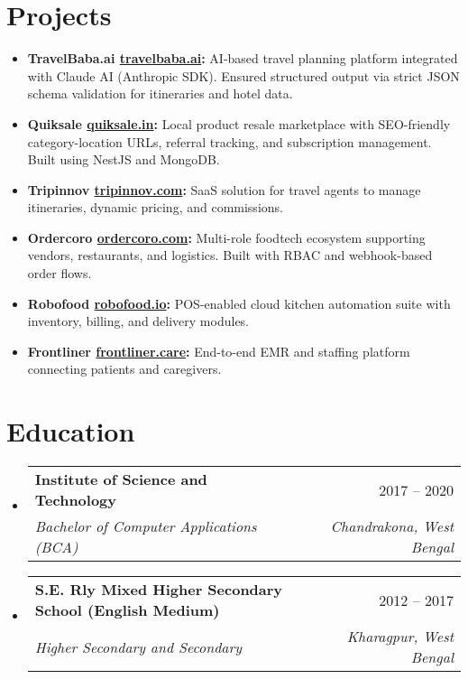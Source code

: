 \documentclass[letterpaper,11pt]{article}
\makeatletter
\newcommand{\resumeItem}[2]{
  \item\small{
    \textbf{#1:} #2 \vspace{-2pt}
  }
}
\newcommand{\resumeSubheading}[4]{
  \vspace{-1pt}\item
    \begin{tabular*}{0.97\textwidth}{l@{\extracolsep{\fill}}r}
      \textbf{#1} & #2 \\
      \textit{\small#3} & \textit{\small #4} \\
    \end{tabular*}\vspace{-5pt}
}
\newcommand{\resumeSubItem}[2]{\resumeItem{#1}{#2}\vspace{-4pt}}
\newcommand{\resumeSubHeadingListStart}{\begin{itemize}[leftmargin=*]}
\newcommand{\resumeSubHeadingListEnd}{\end{itemize}}
\makeatother
\begin{document}
\section{Projects}
\resumeSubHeadingListStart
  \resumeSubItem{TravelBaba.ai \href{https://travelbaba.ai}{travelbaba.ai}}
    {AI-based travel planning platform integrated with Claude AI (Anthropic SDK). Ensured structured output via strict JSON schema validation for itineraries and hotel data.}
  \resumeSubItem{Quiksale \href{https://quiksale.in}{quiksale.in}}
    {Local product resale marketplace with SEO-friendly category-location URLs, referral tracking, and subscription management. Built using NestJS and MongoDB.}
  \resumeSubItem{Tripinnov \href{https://tripinnov.com}{tripinnov.com}}
    {SaaS solution for travel agents to manage itineraries, dynamic pricing, and commissions.}
  \resumeSubItem{Ordercoro \href{https://ordercoro.com}{ordercoro.com}}
    {Multi-role foodtech ecosystem supporting vendors, restaurants, and logistics. Built with RBAC and webhook-based order flows.}
  \resumeSubItem{Robofood \href{https://robofood.io}{robofood.io}}
    {POS-enabled cloud kitchen automation suite with inventory, billing, and delivery modules.}
  \resumeSubItem{Frontliner \href{https://frontliner.care}{frontliner.care}}
    {End-to-end EMR and staffing platform connecting patients and caregivers.}
\resumeSubHeadingListEnd

\section{Education}
\resumeSubHeadingListStart
  \resumeSubheading
    {Institute of Science and Technology}{2017 -- 2020}
    {Bachelor of Computer Applications (BCA)}{Chandrakona, West Bengal}
  \resumeSubheading
    {S.E. Rly Mixed Higher Secondary School (English Medium)}{2012 -- 2017}
    {Higher Secondary and Secondary}{Kharagpur, West Bengal}
\resumeSubHeadingListEnd
\end{document}
